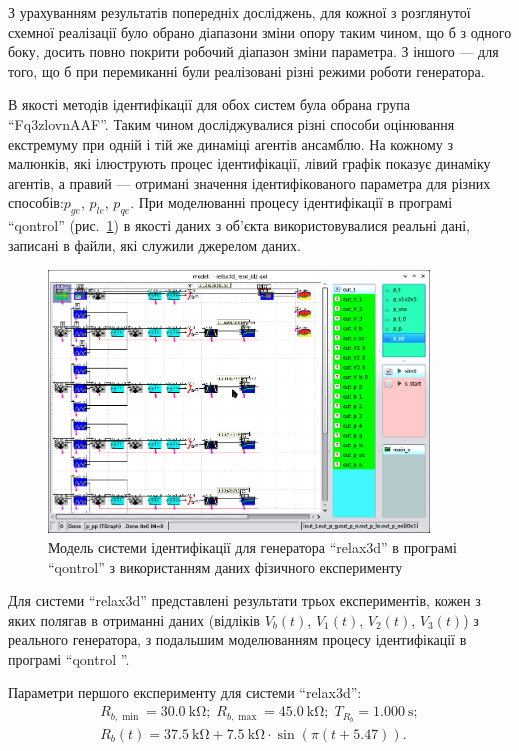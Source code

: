 З урахуванням результатів попередніх досліджень, для кожної з
розглянутої схемної реалізації було обрано діапазони зміни
опору таким чином, що б з одного боку, досить повно покрити
робочий діапазон зміни параметра. З іншого --- для того, що б при
перемиканні були реалізовані різні режими роботи генератора.

В якості методів ідентифікації для обох систем була обрана група
``Fq3zlovnAAF''. Таким чином досліджувалися різні способи оцінювання
екстремуму при одній і тій же динаміці агентів ансамблю. На
кожному з малюнків, які ілюструють процес ідентифікації, лівий
графік показує динаміку агентів, а правий --- отримані значення
ідентифікованого параметра для різних способів:$ p_{ge} $,
$ p_{le} $,
$ p_{qe} $. При моделюванні процесу ідентифікації в програмі ``qontrol''
(рис.~\ref{atu:f:relax3d_id_qontrol}) в якості даних з об'єкта використовувалися
реальні дані, записані в файли, які служили джерелом даних.

\begin{figure}[htb!]
  \centerline{\includegraphics[width=0.9\textwidth]{p/relax3d_id_qontrol.png} }
\caption{Модель системи ідентифікації для генератора ``relax3d'' в програмі ``qontrol'' з використанням даних фізичного експерименту}
\label{atu:f:relax3d_id_qontrol}
\end{figure}

Для системи ``relax3d'' представлені результати трьох експериментів,
кожен з яких полягав в отриманні даних (відліків
$ V_b (t) $,
$ V_1 (t) $,
$ V_2 (t) $,
$ V_3 (t) $) з реального генератора, з подальшим моделюванням процесу
ідентифікації в програмі ``qontrol ''.

Параметри першого експерименту для системи ``relax3d'':
%
\begin{equation}
  \begin{array}{c}
    R_{b,\min} = \SI{30.0}{\kilo\ohm};
    \;
    R_{b,\max} = \SI{45.0}{\kilo\ohm};
    \;
    T_{R_b} = \SI{1.000}{\second};
  \\
    R_b(t) = \SI{37.5}{\kilo\ohm} + \SI{7.5}{\kilo\ohm} \cdot \sin( \pi ( t + 5.47 ) ).
  \end{array}
  \label{atu:eq:relax3d_test1_cond}
\end{equation}

